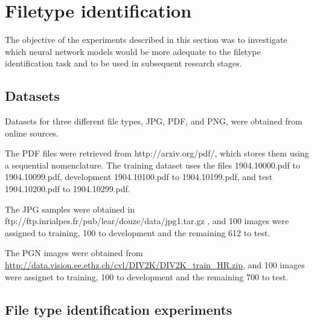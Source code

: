 \section{Filetype identification}
The objective of the experiments described in this section was to investigate which neural network models would be more adequate to the filetype identification task and to be used in subsequent research stages.
\subsection{Datasets}

Datasets for three different file types, JPG, PDF, and PNG, were obtained from online sources.

The PDF files were retrieved from http://arxiv.org/pdf/, which stores them using a sequential nomenclature. The training dataset uses the files 1904.10000.pdf to 1904.10099.pdf, development 1904.10100.pdf to 1904.10199.pdf, and test 1904.10200.pdf to 1904.10299.pdf. 

The JPG samples were obtained in ftp://ftp.inrialpes.fr/pub/lear/douze/data/jpg1.tar.gz , and 100 images were assigned to training, 100 to development and the remaining 612 to test.

The PGN images were obtained from \url{http://data.vision.ee.ethz.ch/cvl/DIV2K/DIV2K_train_HR.zip}, and 100 images were assignet to training, 100 to development and the remaining 700 to test.


\subsection{File type identification experiments}


